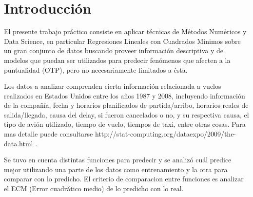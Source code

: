 \section{Introducción}

El presente trabajo práctico consiste en aplicar técnicas de Métodos Numéricos y Data Science, en particular Regresiones Lineales con Cuadrados Mínimos sobre un gran conjunto de datos buscando proveer información descriptiva y de modelos que puedan ser utilizados para predecir fenómenos que afecten a la puntualidad (OTP), pero no necesariamente limitados a ésta.

Los datos a analizar comprenden cierta información relacionada a vuelos realizados en Estados Unidos entre los años 1987 y 2008, incluyendo información de la compañía, fecha y horarios planificados de partida/arribo, horarios reales de salida/llegada, causa del delay, si fueron cancelados o no, y su respectiva causa, el tipo de avión utilizado, tiempo de vuelo, tiempos de taxi, entre otras cosas. Para mas detalle puede consultarse http://stat-computing.org/dataexpo/2009/the-data.html .%

Se tuvo en cuenta distintas funciones para predecir y se analizó cuál predice mejor utilizando una parte de los datos como entrenamiento y la otra para comparar con lo predicho. El criterio de comparacion entre funciones es analizar el ECM (Error cuadrático medio) de lo predicho con lo real.


